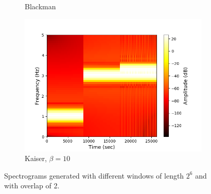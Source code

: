 \begin{figure}[H]
\begin{subfigure}{0.49\textwidth}
\caption{Blackman}
\label{fig:stft_blackman_100}
\includegraphics[width=\textwidth]{figures/stft_windows/100/kaiser_10.png}
\caption{Kaiser, $\beta=10$}
\label{fig:stft_kaiser_100_10}
\end{subfigure}
\caption{Spectrograms generated with different windows of length $2^6$ and with overlap of 2.}
\label{fig:stft_windows_100}
\end{figure}
